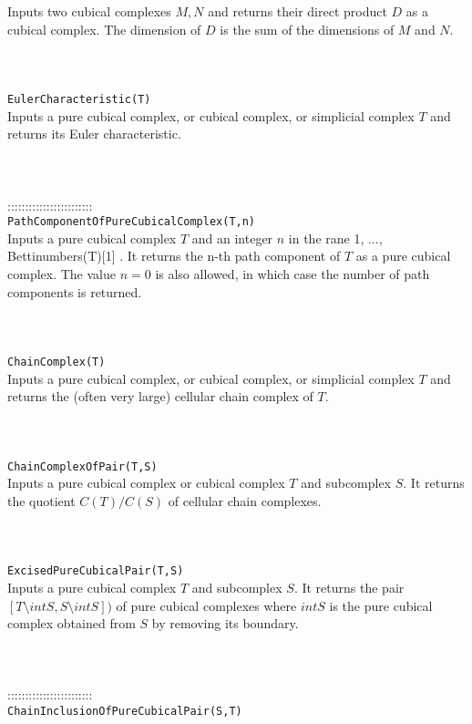 \documentclass[a4paper,11pt]{report}
\begin{document}
{ Inputs two cubical complexes $M,N$ and returns their direct product $D$ as a cubical complex. The dimension of $D$ is the sum of the dimensions of $M$ and $N$. \\
 \\
 \\
 \\
 \texttt{EulerCharacteristic(T)}\\
 

 Inputs a pure cubical complex, or cubical complex, or simplicial complex $T$ and returns its Euler characteristic. \\
 \\
 \\
 \\
 ::::::::::::::::::::::::\\
 \texttt{PathComponentOfPureCubicalComplex(T,n)}\\
 

 Inputs a pure cubical complex $T$ and an integer $n$ in the rane 1, ..., Bettinumbers(T)[1] . It returns the n-th path component of $T$ as a pure cubical complex. The value $n=0$ is also allowed, in which case the number of path components is returned. \\
 \\
 \\
 \\
 \texttt{ChainComplex(T)}\\
 

 Inputs a pure cubical complex, or cubical complex, or simplicial complex $T$ and returns the (often very large) cellular chain complex of $T$. \\
 \\
 \\
 \\
 \texttt{ChainComplexOfPair(T,S)}\\
 

 Inputs a pure cubical complex or cubical complex $T$ and subcomplex $S$. It returns the quotient $C(T)/C(S)$ of cellular chain complexes. \\
 \\
 \\
 \\
 \texttt{ExcisedPureCubicalPair(T,S)}\\
 

 Inputs a pure cubical complex $T$ and subcomplex $S$. It returns the pair $[T\setminus intS, S\setminus intS])$ of pure cubical complexes where $intS$ is the pure cubical complex obtained from $S$ by removing its boundary. \\
 \\
 \\
 \\
 ::::::::::::::::::::::::\\
 \texttt{ChainInclusionOfPureCubicalPair(S,T)}\\
 

}
\end{document}
